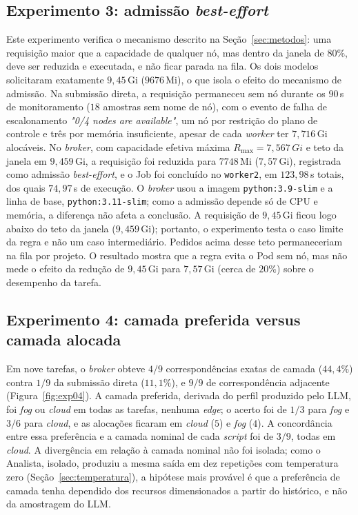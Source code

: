 \documentclass[11pt,a4paper]{article}
\newcommand{\gi}[1]{\ensuremath{#1}\,Gi}
\newcommand{\mi}[1]{\ensuremath{#1}\,Mi}
\begin{document}
\subsection{Experimento 3: admissão \textit{best-effort}}

Este experimento verifica o mecanismo descrito na Seção~\ref{sec:metodos}:
uma requisição maior que a capacidade de qualquer nó, mas dentro da janela
de $80\%$, deve ser reduzida e executada, e não ficar parada na fila. Os dois
modelos solicitaram exatamente \gi{9,45} (\mi{9676}), o que isola o
efeito do mecanismo de admissão. Na submissão direta, a requisição
permaneceu sem nó durante os $90$\,s de monitoramento ($18$ amostras sem nome
de nó), com o evento de falha de escalonamento \textit{"0/4 nodes are
available"}, um nó por restrição do plano de controle e três por memória
insuficiente, apesar de cada \textit{worker} ter \gi{7,716} alocáveis. No
\textit{broker}, com capacidade efetiva máxima $R_{\max}=\gi{7,567}$ e teto
da janela em \gi{9,459}, a requisição foi reduzida para \mi{7748}
(\gi{7,57}), registrada como admissão \textit{best-effort}, e o Job foi
concluído no \texttt{worker2}, em $123{,}98$\,s totais, dos quais $74{,}97$\,s
de execução. O \textit{broker} usou a imagem
\texttt{python:3.9-slim} e a linha de base, \texttt{python:3.11-slim}; como a
admissão depende só de CPU e memória, a diferença não afeta a conclusão.
A requisição de \gi{9,45} ficou logo abaixo do teto da janela
(\gi{9,459}); portanto, o experimento testa o caso limite da regra e não um
caso intermediário. Pedidos acima desse teto permaneceriam na fila por
projeto. O resultado mostra que a regra evita o Pod sem nó, mas não mede o
efeito da redução de \gi{9,45} para \gi{7,57} (cerca de $20\%$) sobre o
desempenho da tarefa.

\subsection{Experimento 4: camada preferida versus camada alocada}\label{sec:exp04}

Em nove tarefas, o \textit{broker} obteve $4/9$ correspondências exatas de
camada ($44{,}4\%$) contra $1/9$ da submissão direta ($11{,}1\%$), e $9/9$
de correspondência adjacente (Figura~\ref{fig:exp04}). A camada preferida,
derivada do perfil produzido pelo LLM, foi \textit{fog} ou \textit{cloud} em
todas as tarefas, nenhuma \textit{edge}; o acerto foi de $1/3$ para
\textit{fog} e $3/6$ para \textit{cloud}, e as alocações ficaram em
\textit{cloud} ($5$) e \textit{fog} ($4$). A concordância entre essa
preferência e a camada nominal de cada \textit{script} foi de $3/9$, todas
em \textit{cloud}. A divergência em relação à camada nominal não foi
isolada; como o Analista, isolado, produziu a mesma saída em dez repetições
com temperatura zero (Seção~\ref{sec:temperatura}), a hipótese mais
provável é que a preferência de camada tenha dependido dos recursos
dimensionados a partir do histórico, e não da amostragem do LLM.
\end{document}
